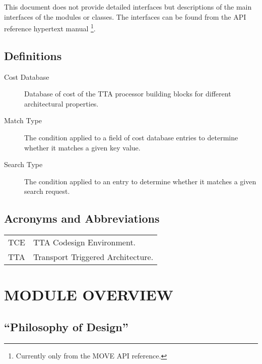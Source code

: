 \documentclass[a4paper,twoside]{tce}
\begin{document}
This document does not provide detailed interfaces but descriptions of
the main interfaces of the modules or classes. The interfaces can be
found from the API reference hypertext manual \footnote{
	Currently only from the MOVE API reference.
}.

\section{Definitions}

\begin{description}

\item[Cost Database] %
    Database of cost of the TTA processor building blocks for
    different architectural properties.

\item[Match Type] %
    The condition applied to a field of cost database entries to
    determine whether it matches a given key value.

\item[Search Type] %
    The condition applied to an entry to determine whether it matches
    a given search request.

\end{description}

\section{Acronyms and Abbreviations}


\begin{table}[htb]
\begin{center}
\begin{tabular}{p{}p{}}
TCE   & TTA Codesign Environment. \\
TTA   & Transport Triggered Architecture. \\
\end{tabular}
\end{center}
\end{table}



\chapter{MODULE OVERVIEW}

\section{``Philosophy of Design''}
\end{document}
